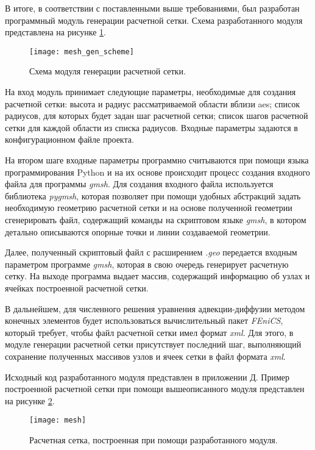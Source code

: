 В итоге, в соответствии с поставленными выше требованиями, был разработан программный модуль генерации расчетной сетки. 
Схема разработанного модуля представлена на рисунке \ref{fig_mesh_gen_scheme}. 

\begin{figure}[ht]
	\centering
	\texttt{[image: mesh\_gen\_scheme]}
	\captionsetup{justification=centering}
    \caption{Схема модуля генерации расчетной сетки.}
    \label{fig_mesh_gen_scheme}
\end{figure}

На вход модуль принимает следующие параметры, необходимые для создания расчетной сетки: высота и радиус рассматриваемой 
области вблизи \ac{aes}; список радиусов, для которых будет задан шаг расчетной сетки; список шагов расчетной сетки для 
каждой области из списка радиусов. Входные параметры задаются в конфигурационном файле проекта.

На втором шаге входные параметры программно считываются при помощи языка программирования Python и на их основе 
происходит процесс создания входного файла для программы \textit{gmsh}. Для создания входного файла используется 
библиотека \textit{pygmsh}, которая позволяет при помощи удобных абстракций задать необходимую геометрию расчетной сетки 
и на основе полученной геометрии сгенерировать файл, содержащий команды на скриптовом языке \textit{gmsh}, в котором 
детально описываются опорные точки и линии создаваемой геометрии. 

Далее, полученный скриптовый файл с расширением \textit{.geo} передается входным параметром программе \textit{gmsh}, 
которая в свою очередь генерирует расчетную сетку. На выходе программа выдает массив, содержащий информацию об узлах и 
ячейках построенной расчетной сетки.

В дальнейшем, для численного решения уравнения адвекции-диффузии методом конечных элементов будет использоваться 
вычислительный пакет \textit{FEniCS}, который требует, чтобы файл расчетной сетки имел формат \textit{xml}. Для этого, 
в модуле генерации расчетной сетки присутствует последний шаг, выполняющий сохранение полученных массивов узлов и ячеек 
сетки в файл формата \textit{xml}.

Исходный код разработанного модуля представлен в приложении Д. Пример построенной расчетной сетки при помощи 
вышеописанного модуля представлен на рисунке \ref{fig_mesh_img}.

\begin{figure}[ht]
	\centering
	\texttt{[image: mesh]}
	\captionsetup{justification=centering}
    \caption{Расчетная сетка, построенная при помощи разработанного модуля.}
    \label{fig_mesh_img}
\end{figure}

